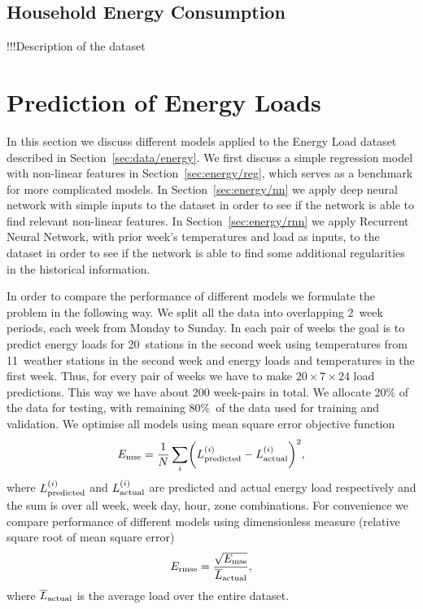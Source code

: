 \documentclass{article} %
\newcommand{\Ermse}{E_{\rm \scriptsize rmse}}
\begin{document}
\subsection{Household Energy Consumption}
\label{sec:data/house}

{\LARGE \color{red} !!!Description of the dataset}




\section{Prediction of Energy Loads}
\label{sec:energy}

In this section we discuss different models applied to the Energy Load dataset
described in Section~\ref{sec:data/energy}.
We first discuss a simple regression model with non-linear features
in Section~\ref{sec:energy/reg}, which serves as a benchmark for more 
complicated models.
In Section~\ref{sec:energy/nn} we apply deep neural network with simple inputs
to the dataset in order to see if the network is able to find relevant 
non-linear features.
In Section~\ref{sec:energy/rnn} we apply Recurrent Neural Network,
with prior week's temperatures and load as inputs, to the dataset
in order to see if the network is able to find some additional
regularities in the historical information.

In order to compare the performance of different models we formulate the 
problem in the following way. We split all the data into overlapping
2~week periods, each week from Monday to Sunday.
In each pair of weeks the goal is to predict energy loads for 20~stations
in the second week
using temperatures from 11~weather stations in the second week and 
energy loads and temperatures in the first week. 
Thus, for every pair of weeks 
we have to make $20\times7\times24$ load predictions.
This way we have about 200 week-pairs in total.
We allocate 20\% of the data for testing, with remaining 80\%~of the 
data used for training and validation.
We optimise all models using mean square error objective function
\begin{equation}
	E_{\rm\scriptsize mse} = 
	\frac{1}{N}\sum_i \biggl(
	L_{\rm\scriptsize predicted}^{(i)}-
	L_{\rm\scriptsize actual}^{(i)}\biggr)^2,
\end{equation}
where $L_{\rm\scriptsize predicted}^{(i)}$
and $L_{\rm\scriptsize actual}^{(i)}$ are predicted and actual
energy load respectively and the sum is over all week, week day, hour, zone
combinations.
For convenience we compare performance of different models using dimensionless
measure (relative square root of mean square error)
\begin{equation}
	\Ermse =
	\frac{\sqrt{E_{\rm\scriptsize mse} }}{\overline{L}_{\rm\scriptsize actual}}, 
\end{equation}
where $\overline{L}_{\rm\scriptsize actual}$ is the average load
over the entire dataset.
\end{document}
